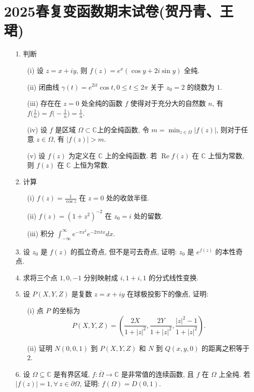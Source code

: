 \section{2025春复变函数期末试卷(贺丹青、王珺)}
\begin{enumerate}
    \item[1.]    判断
        \begin{enumerate}
            \item[(i)] 设 $z = x + iy$, 则 $f(z) = e^{x}(\cos y + 2i\sin y)$ 全纯.
            \item[(ii)] 闭曲线 $\gamma(t) = e^{2it}\cos t, 0\le t\le 2\pi$ 关于 $z_0=2$ 的绕数为 $1$.
            \item[(iii)] 存在在 $z=0$ 处全纯的函数 $f$ 使得对于充分大的自然数 $n$, 
            有 $f\big(\frac{1}{n}\big)=f\big(\!-\frac{1}{n}\big)=\frac{1}{n}$.
            \item[(iv)] 设 $f$ 是区域 $\Omega \subset \mathbb{C}$上的全纯函数, 
            令 $m=\min_{z\in \Omega}|f(z)|$, 则对于任意 $z \in \Omega$, 有 $|f(z)| > m$.
            \item[(v)] 设 $f(z)$ 为定义在 $\mathbb{C}$ 上的全纯函数. 
            若 $\operatorname{Re}f(z)$ 在 $\mathbb{C}$ 上恒为常数, 
            则 $f(z)$ 在 $\mathbb{C}$ 上恒为常数.
        \end{enumerate}
    
    \item[2.]    计算
        \begin{enumerate}
            \item[(i)] $f(z)= \frac{1}{\cos z}$ 在 $z=0$ 处的收敛半径.
            \item[(ii)] $f(z) = (1+z^{2})^{-2}$ 在 $z_0=i$ 处的留数.
            \item[(iii)] 积分 $\int_{-\infty}^{\infty} e^{-\pi x^{2}}e^{-2\pi itx}dx.$
        \end{enumerate}
    
    \item[3.]    设 $z_0$ 是 $f(z)$ 的孤立奇点, 但不是可去奇点, 证明: $z_0$ 是 $e^{f(z)}$ 的本性奇点.
    \item[4.]    求将三个点 $1,0,-1$ 分别映射成 $i,1+i,1$ 的分式线性变换.
    \item[5.]    设 $P(X,Y,Z)$ 是复数 $z = x+iy$ 在球极投影下的像点, 证明:
        \begin{enumerate}
            \item[(i)] 点 $P$ 的坐标为
                $$
                P(X,Y,Z)=\left(\frac{2X}{1+|z|^{2}},\frac{2Y}{1+|z|^{2}},\frac{|z|^{2}-1}{1+|z|^{2}}\right).
                $$
            \item[(ii)] 证明 $N(0,0,1)$ 到 $P(X,Y,Z)$ 和 $N$ 到 $Q(x,y,0)$ 的距离之积等于 $2$.
        \end{enumerate}
    \item[6.]    设 $\Omega \subseteq \mathbb{C}$ 是有界区域, 
    $f:\overline{\Omega}\to \mathbb{C}$ 是非常值的连续函数, 且 $f$ 在 $\Omega$ 上全纯. 
    若 $|f(z)| =1,\forall \, z\in \partial \Omega$, 证明: $f(\Omega)=D(0,1)$.
\end{enumerate}


